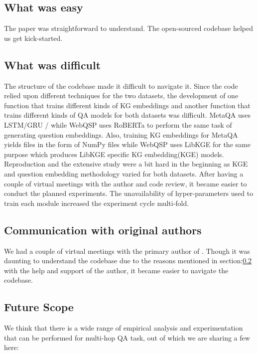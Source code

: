 \subsection{What was easy}

The paper was straightforward to understand. The open-sourced codebase helped us get kick-started. 

\subsection{What was difficult}\label{sec:diffcult-reasons}

The structure of the codebase made it difficult to navigate it. Since the code relied upon different techniques for the two datasets, the development of one function that trains different kinds of KG embeddings and another function that trains different kinds of QA models for both datasets was difficult. MetaQA uses LSTM/GRU \cite{lstm} / \cite{GRU} while WebQSP uses RoBERTa \cite{roberta} to perform the same task of generating question embeddings. Also, training KG embeddings for MetaQA yields files in the form of NumPy \cite{NumPy} files while WebQSP uses LibKGE \cite{libkge} for the same purpose which produces LibKGE specific KG embedding(KGE) models. Reproduction and the extensive study were a bit hard in the beginning as KGE and question embedding methodology varied for both datasets.  After having a couple of virtual meetings with the author and code review, it became easier to conduct the planned experiments. The unavailability of hyper-parameters used to train each module increased the experiment cycle multi-fold. 

\subsection{Communication with original authors}

We had a couple of virtual meetings with the primary author of \cite{saxena-etal-2020-improving}. Though it was daunting to understand the codebase due to the reasons mentioned in section:\ref{sec:diffcult-reasons} with the help and support of the author, it became easier to navigate the codebase. 

\subsection{Future Scope}

We think that there is a wide range of empirical analysis and experimentation that can be performed for multi-hop QA task, out of which we are sharing a few here:

